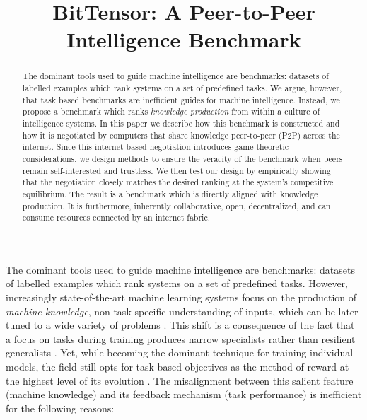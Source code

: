 \documentclass{article}
\title{BitTensor: A Peer-to-Peer Intelligence Benchmark}
\begin{document}
\maketitle

\begin{abstract}
The dominant tools used to guide machine intelligence are benchmarks: datasets of labelled examples which rank systems on a set of predefined tasks. We argue, however, that task based benchmarks are inefficient guides for machine intelligence. Instead, we propose a benchmark which ranks \textit{knowledge production} from within a culture of intelligence systems. In this paper we describe how this benchmark is constructed and how it is negotiated by computers that share knowledge peer-to-peer (P2P) across the internet. Since this internet based negotiation introduces game-theoretic considerations, we design methods to ensure the veracity of the benchmark when peers remain self-interested and trustless. We then test our design by empirically showing that the negotiation closely matches the desired ranking at the system's competitive equilibrium. The result is a benchmark which is directly aligned with knowledge production. It is furthermore, inherently collaborative, open, decentralized, and can consume resources connected by an internet fabric.

\end{abstract}

The dominant tools used to guide machine intelligence are benchmarks: datasets of labelled examples which rank systems on a set of predefined tasks. However, increasingly state-of-the-art machine learning systems focus on the production of \textit{machine knowledge}, non-task specific understanding of inputs, which can be later tuned to a wide variety of problems \cite{devlin2018bert}. This shift is a consequence of the fact that a focus on tasks during training produces narrow specialists rather than resilient generalists \cite{radford2019language}. Yet, while becoming the dominant technique for training individual models, the field still opts for task based objectives as the method of reward at the highest level of its evolution \cite{wang2018glue}. The misalignment between this salient feature (machine knowledge) and its feedback mechanism (task performance) is inefficient for the following reasons:
\end{document}
